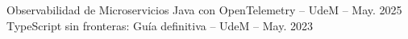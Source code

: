 Observabilidad de Microservicios Java con OpenTelemetry -- UdeM -- May. 2025\\
TypeScript sin fronteras: Guía definitiva -- UdeM -- May. 2023
